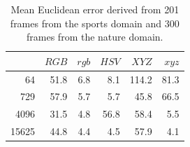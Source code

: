\documentclass[11pt]{article}
\begin{document}
\begin{table}[!ht]
\centering
\begin{tabular}{r||r|r|r|r|r}
	      & $RGB$ & $rgb$ & $HSV$ & $XYZ$ & $xyz$ \\ \hline \hline
	   64 &  51.8 &   6.8 &   8.1 & 114.2 &  81.3 \\ \hline
	  729 &  57.9 &   5.7 &   5.7 &  45.8 &  66.5 \\ \hline
	 4096 &  31.5 &   4.8 &  56.8 &  58.4 &   5.5 \\ \hline
	15625 &  44.8 &   4.4 &   4.5 &  57.9 &   4.1 \\ \hline
\end{tabular}
\caption{Mean Euclidean error derived from 201 frames from the sports domain and
300 frames from the nature domain.}
\label{tbl:error}
\end{table}
\end{document}
